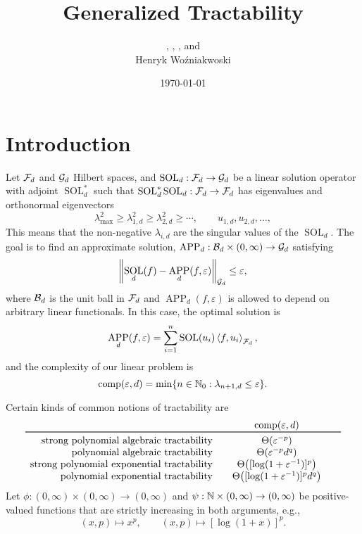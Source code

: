 \documentclass{article}
\title{Generalized Tractability}
\author{\fred{Fred J. Hickernell}, \peter{Peter Kritzer}, \kachi{Onyekachi Osisiogu}, and \\ Henryk Wo\'zniakwoski}
\date{\today}
\DeclareMathOperator{\SOL}{SOL}
\DeclareMathOperator{\APP}{APP}
\theoremstyle{definition}
\begin{document}
\maketitle

\section{Introduction}

Let $\mathcal{F}_d$ and $\mathcal{G}_d$ Hilbert spaces, and $\SOL_d : \cf_d \to \cg_d$ be a linear solution operator with adjoint $\SOL_d^*$ such that $\SOL_d^*\SOL_d : \cf_d \to \cf_d$ has eigenvalues and orthonormal eigenvectors  
\[
\lambda_{\max}^2 \ge \lambda_{1,d}^2 \ge \lambda_{2,d}^2 \ge \cdots, \qquad u_{1,d}, u_{2,d}, \ldots, 
\]
This means that the non-negative $\lambda_{i,d}$ are the singular values of the $\SOL_d$. The goal is to find an approximate solution, $\APP_d:\cb_d \times (0,\infty) \to \cg_d$ satisfying 
\[
\norm[\cg_d]{\SOL_d(f) - \APP_d(f,\varepsilon)} \le \varepsilon,
\]
where $\mathcal{B}_d$ is the unit ball in $\mathcal{F}_d$ and $\APP_d(f,\varepsilon)$ is allowed to depend on arbitrary linear functionals.  In this case, the optimal solution is 
\[
\APP_d(f,\varepsilon) = \sum_{i=1}^n \SOL(u_i) \ip[\cf_d]{f}{u_i},
\]
and the complexity of our linear problem is
\[
\operatorname{comp}(\varepsilon, d) = \min \{n \in \mathbb{N}_{0} : \lambda_{n+1, d} \le \varepsilon\}.
\]

Certain kinds of common notions of tractability are 
\begin{equation*}
    \begin{array}{r@{\qquad}c@{\qquad}c}
    & \comp(\varepsilon, d)\\
    \toprule
    \text{strong polynomial algebraic  tractability} & \Theta(\varepsilon^{-p})\\
    \text{polynomial algebraic tractability} & \Theta(\varepsilon^{-p}d^{q})\\
    \text{strong polynomial exponential tractability} &  \Theta\bigl([\log(1 + \varepsilon^{-1})]^p\bigr)\\
    \text{polynomial exponential tractability} & \Theta\bigl([\log(1 + \varepsilon^{-1})]^p  d^{q}\bigr)
    \end{array}
\end{equation*}
Let $\phi : (0,\infty) \times (0,\infty) \to (0,\infty)$ and $\psi : \mathbb{N}  \times (0,\infty) \to (0,\infty)$ be positive-valued functions that are strictly increasing in both arguments, e.g., 
\[
(x,p) \mapsto x^{p}, \qquad (x,p) \mapsto [\log(1+x)]^p.
\]
\end{document}
